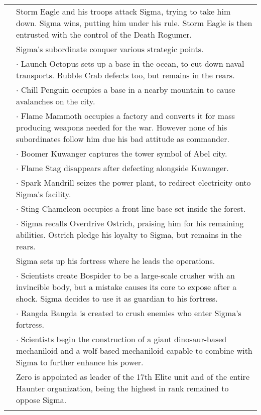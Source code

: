 \begin{tabularx}{\linewidth}{l X}
	\tabdot& Storm Eagle and his troops attack Sigma, trying to take him down. Sigma wins, putting him under his rule. Storm Eagle is then entrusted with the control of the Death Rogumer.\\
	\tabdot& Sigma's subordinate conquer various strategic points.\\
	\tabline& $\cdot$ Launch Octopus sets up a base in the ocean, to cut down naval transports. Bubble Crab defects too, but remains in the rears.\\
	\tabline& $\cdot$ Chill Penguin occupies a base in a nearby mountain to cause avalanches on the city.\\
	\tabline& $\cdot$ Flame Mammoth occupies a factory and converts it for mass producing weapons needed for the war. However none of his subordinates follow him due his bad attitude as commander.\\
	\tabline& $\cdot$ Boomer Kuwanger captures the tower symbol of Abel city.\\
	\tabline& $\cdot$ Flame Stag disappears after defecting alongside Kuwanger.\\
	\tabline& $\cdot$ Spark Mandrill seizes the power plant, to redirect electricity onto Sigma's facility.\\
	\tabline& $\cdot$ Sting Chameleon occupies a front-line base set inside the forest.\\
	\tabline& $\cdot$ Sigma recalls Overdrive Ostrich, praising him for his remaining abilities. Ostrich pledge his loyalty to Sigma, but remains in the rears.\\
	\tabdot& Sigma sets up his fortress where he leads the operations.\\
	\tabline& $\cdot$ Scientists create Bospider to be a large-scale crusher with an invincible body, but a mistake causes its core to expose after a shock. Sigma decides to use it as guardian to his fortress.\\
	\tabline& $\cdot$ Rangda Bangda is created to crush enemies who enter Sigma's fortress.\\
	\tabline& $\cdot$ Scientists begin the construction of a giant dinosaur-based mechaniloid and a wolf-based mechaniloid capable to combine with Sigma to further enhance his power.\\
	\tabdot& Zero is appointed as leader of the 17th Elite unit and of the entire Haunter organization, being the highest in rank remained to oppose Sigma.\\
	\midrule
	\rowcolor{Aquamarine}
	\multicolumn{2}{c}{\textbf{Mega Man X}}\\

\end{tabularx}
